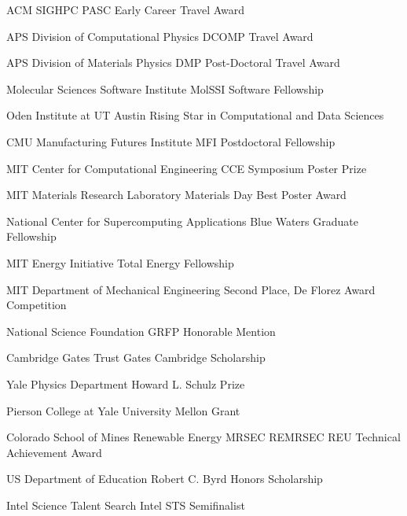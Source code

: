 {ACM SIGHPC}
{PASC Early Career Travel Award}
{}

{APS Division of Computational Physics}
{DCOMP Travel Award}
{}

\datedsubsectionnarrow{}
{APS Division of Materials Physics}
{DMP Post-Doctoral Travel Award}{}

{Molecular Sciences Software Institute}
{MolSSI Software Fellowship}{}

\datedsubsectionnarrow{}
{Oden Institute at UT Austin}
{Rising Star in Computational and Data Sciences}{}

{CMU Manufacturing Futures Institute}
{MFI Postdoctoral Fellowship}{}

\datedsubsectionnarrow{}
{MIT Center for Computational Engineering}
{CCE Symposium Poster Prize}{}

{MIT Materials Research Laboratory}
{Materials Day Best Poster Award}{}

{National Center for Supercomputing Applications}
{Blue Waters Graduate Fellowship}{}

{MIT Energy Initiative}
{Total Energy Fellowship}{}

\datedsubsectionnarrow{}
{MIT Department of Mechanical Engineering}
{Second Place, De Florez Award Competition}{}

{National Science Foundation}
{GRFP Honorable Mention}{}

{Cambridge Gates Trust}
{Gates Cambridge Scholarship}{}

\datedsubsectionnarrow{}
{Yale Physics Department}
{Howard L. Schulz Prize}{}

{Pierson College at Yale University}
{Mellon Grant}{}

\datedsubsectionnarrow{}
{Colorado School of Mines Renewable Energy MRSEC}
{REMRSEC REU Technical Achievement Award}{}

{US Department of Education}
{Robert C. Byrd Honors Scholarship}{}

\datedsubsectionnarrow{}
{Intel Science Talent Search}
{Intel STS Semifinalist}{}
